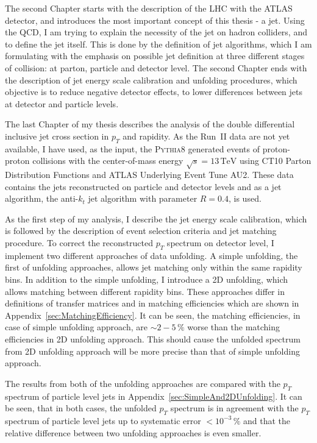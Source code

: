 \documentclass[a4paper,11pt,twoside,openright]{book}
\newcommand{\TeV}{\,\text{TeV}}
\newcommand{\pt}{p_{T}}
\begin{document}
The second Chapter starts with the description of the LHC with the ATLAS
detector, and introduces the most important concept of this thesis - a jet. Using
the QCD, I am trying to explain the necessity of the jet on hadron colliders,
and to define the jet itself. This is done by the definition of jet algorithms,
which I am formulating with the emphasis on possible jet definition at three
different stages of collision: at parton, particle and detector level. The
second Chapter ends with the description of jet energy scale calibration and
unfolding procedures, which objective is to reduce negative detector effects, 
to lower differences between jets at detector and particle levels. 

The last Chapter of my thesis describes the analysis of the double differential
inclusive jet cross section in $\pt$ and rapidity. As the Run~II data are
not yet available, I have used, as the input, the \textsc{Pythia8} generated
events of proton-proton collisions with the center-of-mass energy $\sqrt{s}=13\TeV$ using
CT10 Parton Distribution Functions and ATLAS Underlying Event Tune AU2. These
data contains the jets reconstructed on particle and detector levels and as a
jet algorithm, the anti-$k_t$ jet algorithm with parameter $R=0.4$, is used.

As the first step of my analysis, I describe the jet energy scale calibration,
which is followed by the description of event selection criteria and jet
matching procedure. To correct the reconstructed $\pt$ spectrum on detector
level, I implement two different approaches of data unfolding. A simple
unfolding, the first of unfolding approaches, allows jet matching only within
the same rapidity bins. In addition to the simple unfolding, I introduce a 2D
unfolding, which allows matching between different rapidity bins. These
approaches differ in definitions of transfer matrices and in matching
efficiencies which are shown in Appendix~\ref{sec:MatchingEfficiency}.
It can be seen, the matching efficiencies, in case of simple unfolding approach, are $\sim
2-5\,\%$ worse than the matching efficiencies in 2D unfolding approach. This should cause
the unfolded spectrum from 2D unfolding approach will be more precise than that of simple
unfolding approach.

The results from both of the unfolding approaches are compared with the $\pt$
spectrum of particle level jets in Appendix~\ref{sec:SimpleAnd2DUnfolding}. It
can be seen, that in both cases, the unfolded $\pt$ spectrum is in agreement
with the $\pt$ spectrum of particle level jets up to systematic error $<
10^{-3}\,\%$ and that the relative difference between two unfolding approaches
is even smaller.
\end{document}
